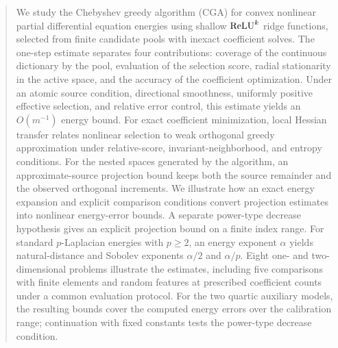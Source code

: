 \begin{abstract}
We study the Chebyshev greedy algorithm (CGA) for convex nonlinear partial differential
equation energies using shallow \(\relu^k\) ridge functions, selected from finite candidate
pools with inexact coefficient solves. The one-step estimate separates four contributions:
coverage of the continuous dictionary by the pool, evaluation of the selection score,
radial stationarity in the active space, and the accuracy of the coefficient optimization.
Under an atomic source condition, directional smoothness, uniformly positive effective
selection, and relative error control, this estimate yields an \(O(m^{-1})\) energy bound.
For exact coefficient minimization, local Hessian transfer relates nonlinear selection
to weak orthogonal greedy approximation under relative-score, invariant-neighborhood,
and entropy conditions.
For the nested spaces generated by the algorithm, an approximate-source projection bound
keeps both the source remainder and the observed orthogonal increments. We illustrate how an exact energy expansion and explicit comparison conditions
convert projection estimates into nonlinear energy-error bounds. A separate power-type decrease hypothesis gives an explicit projection
bound on a finite index range. For standard \(p\)-Laplacian energies with \(p\geq2\), an energy
exponent \(\alpha\) yields natural-distance and Sobolev exponents \(\alpha/2\) and
\(\alpha/p\).
Eight one- and two-dimensional problems illustrate the estimates, including five comparisons with finite elements and random features at prescribed coefficient counts under a common evaluation protocol.
For the two quartic auxiliary models, the resulting bounds cover the computed energy errors over the calibration range; continuation with fixed constants tests the power-type decrease condition.
\end{abstract}
